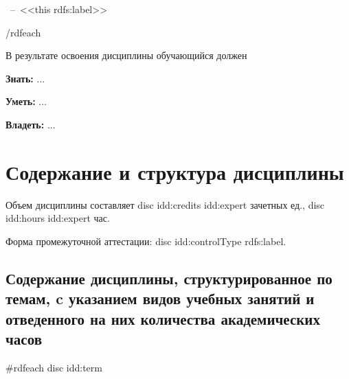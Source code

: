 \documentclass[12pt]{scrartcl}
\newcommand{\rdf}[2]{#2}
\newenvironment{rdfctx}[1]{}{}
\renewcommand{\paragraph}[1]{\par\textbf{#1}}
\begin{document}
\ --\ <<{{this rdfs:label}}>> \par

{{/rdfeach}}

\begin{rdfctx}{\rdfsetctx{dc}{syll wpdd:courseDC !wpdd:CourseDC}}
В результате освоения дисциплины обучающийся должен

\paragraph{Знать:} \rdf{dc wpdd:know !cnt:ContentAsText}{...}

\paragraph{Уметь:} \rdf{dc wpdd:ableTo !cnt:ContentAsText}{...}

\paragraph{Владеть:} \rdf{dc wpdd:posess !cnt:ContentAsText}{...}
\end{rdfctx}

\section{Содержание и структура дисциплины}

Объем дисциплины составляет {{disc idd:credits idd:expert}} зачетных ед., {{disc idd:hours idd:expert}} час.

Форма промежуточной аттестации: {{disc idd:controlType rdfs:label}}.

\subsection{Содержание дисциплины, структурированное по темам, c указанием видов
  учебных занятий и отведенного на них количества академических часов} %
{{#rdfeach disc idd:term }}
\end{document}
